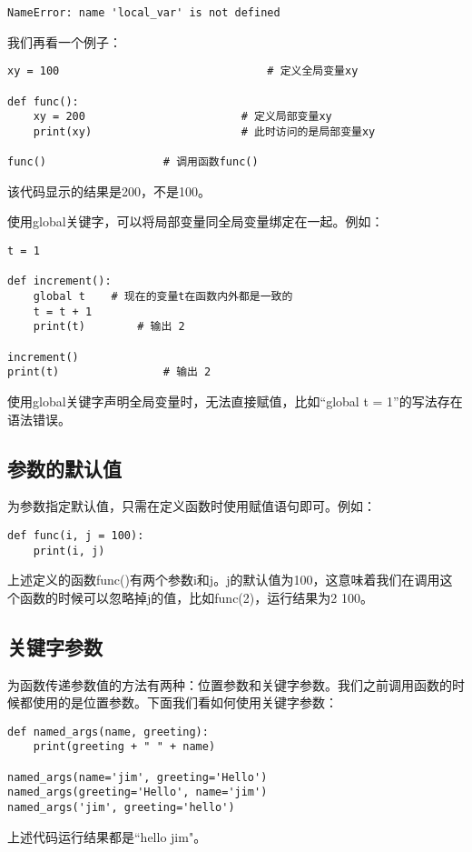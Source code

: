\begin{lstlisting}
NameError: name 'local_var' is not defined
\end{lstlisting}

我们再看一个例子：

\begin{lstlisting}
xy = 100								# 定义全局变量xy

def func():
    xy = 200						# 定义局部变量xy
    print(xy)						# 此时访问的是局部变量xy

func()                  # 调用函数func()
\end{lstlisting}

该代码显示的结果是200，不是100。

使用global关键字，可以将局部变量同全局变量绑定在一起。例如：

\begin{lstlisting}
t = 1

def increment():
    global t   	# 现在的变量t在函数内外都是一致的
    t = t + 1
    print(t) 		# 输出 2

increment()
print(t) 				# 输出 2
\end{lstlisting}

\begin{myremark}{}
使用global关键字声明全局变量时，无法直接赋值，比如“global t = 1”的写法存在语法错误。
\end{myremark}

\subsection{参数的默认值}
为参数指定默认值，只需在定义函数时使用赋值语句即可。例如：

\begin{lstlisting}
def func(i, j = 100):
    print(i, j)
\end{lstlisting}

上述定义的函数func()有两个参数i和j。j的默认值为100，这意味着我们在调用这个函数的时候可以忽略掉j的值，比如func(2)，运行结果为2 100。

\subsection{关键字参数}
为函数传递参数值的方法有两种：位置参数和关键字参数。我们之前调用函数的时候都使用的是位置参数。下面我们看如何使用关键字参数：

\begin{lstlisting}
def named_args(name, greeting):
    print(greeting + " " + name)

named_args(name='jim', greeting='Hello')
named_args(greeting='Hello', name='jim')
named_args('jim', greeting='hello')
\end{lstlisting}
上述代码运行结果都是“hello jim"。

